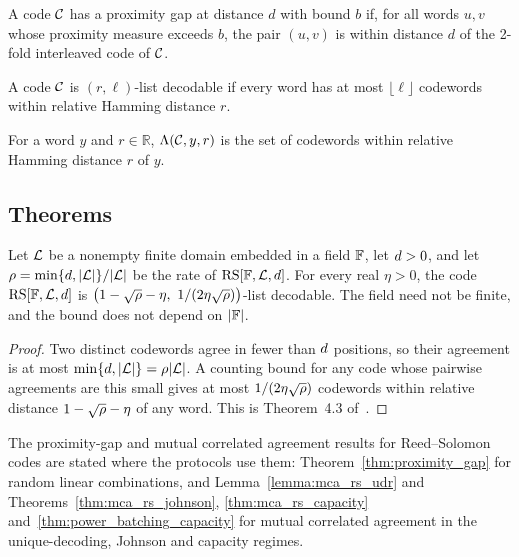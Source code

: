 \begin{definition}
    \label{def:proximity_gap}
    \leanok
    A code $\mathcal{C}$ has a proximity gap at distance $d$ with bound $b$ if, for all words $u,v$
    whose proximity measure exceeds $b$, the pair $(u,v)$ is within distance $d$ of the
    2-fold interleaved code of $\mathcal{C}$.
\end{definition}

\begin{definition}
    \label{def:list_decodable}
    \leanok
    A code $\mathcal{C}$ is $(r,\ell)$-list decodable if every word has at most $\lfloor\ell\rfloor$
    codewords within relative Hamming distance $r$.
\end{definition}

\begin{definition}
    \label{def:list_close_codewords}
    \leanok
    For a word $y$ and $r\in\mathbb{R}$, $\Lambda(\mathcal{C},y,r)$ is the set of codewords within
    relative Hamming distance $r$ of $y$.
\end{definition}

\subsection{Theorems}

\begin{theorem}
    \label{thm:rs_list_decoding_johnson}
    \leanok
    Let $\mathcal{L}$ be a nonempty finite domain embedded in a field $\mathbb{F}$, let $d>0$,
    and let $\rho=\min\{d,|\mathcal{L}|\}/|\mathcal{L}|$ be the rate of
    $\mathrm{RS}[\mathbb{F},\mathcal{L},d]$. For every real $\eta>0$, the code
    $\mathrm{RS}[\mathbb{F},\mathcal{L},d]$ is
    $\bigl(1-\sqrt{\rate}-\eta,\ 1/(2\eta\sqrt{\rate})\bigr)$-list decodable. The field need not
    be finite, and the bound does not depend on $|\mathbb{F}|$.
\end{theorem}
\begin{proof}
    \leanok
    Two distinct codewords agree in fewer than $d$ positions, so their agreement is at
    most $\min\{d,|\mathcal{L}|\}=\rho|\mathcal{L}|$. A counting bound for any code whose
    pairwise agreements are this small gives at most $1/(2\eta\sqrt{\rho})$ codewords within
    relative distance $1-\sqrt{\rho}-\eta$ of any word. This is Theorem~4.3 of~\cite{ACFY24}.
\end{proof}

The proximity-gap and mutual correlated agreement results for Reed--Solomon codes are stated
where the protocols use them: Theorem~\ref{thm:proximity_gap} for random linear combinations,
and Lemma~\ref{lemma:mca_rs_udr} and Theorems~\ref{thm:mca_rs_johnson},
\ref{thm:mca_rs_capacity} and~\ref{thm:power_batching_capacity} for mutual correlated agreement
in the unique-decoding, Johnson and capacity regimes.
